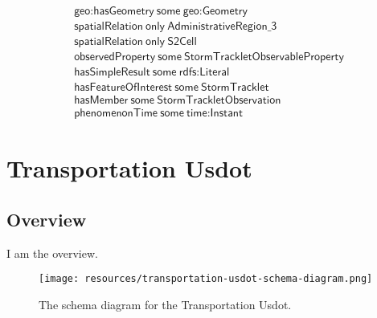 \begin{align}
  \textsf{geo:hasGeometry}~\textsf{some}~\textsf{geo:Geometry}\\
  \textsf{spatialRelation}~\textsf{only}~\textsf{AdministrativeRegion\_3}\\
  \textsf{spatialRelation}~\textsf{only}~\textsf{S2Cell}\\
  \textsf{observedProperty}~\textsf{some}~\textsf{StormTrackletObservableProperty}\\
  \textsf{hasSimpleResult}~\textsf{some}~\textsf{rdfs:Literal}\\
  \textsf{hasFeatureOfInterest}~\textsf{some}~\textsf{StormTracklet}\\
  \textsf{hasMember}~\textsf{some}~\textsf{StormTrackletObservation}\\
  \textsf{phenomenonTime}~\textsf{some}~\textsf{time:Instant}\end{align}



\section{Transportation Usdot}
\label{sec:transportation-usdot}
\subsection{Overview}
\label{ssec:overview}

I am the overview.

\begin{figure}[h!]
  \begin{center}
    \texttt{[image: resources/transportation-usdot-schema-diagram.png]}
  \end{center}
  \caption{The schema diagram for the Transportation Usdot.}
  \label{fig:ov-diagram}
\end{figure}



